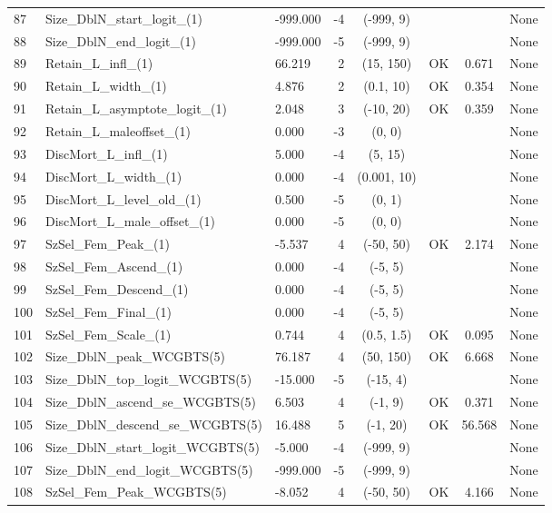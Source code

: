\documentclass[12pt,]{article}
\begin{document}
\begin{landscape}
\begin{longtable}{lp{2.5in}lrcccl}
  87 & Size\_DblN\_start\_logit\_(1) & -999.000 & -4 & (-999, 9) &  &  & None \\ 
  88 & Size\_DblN\_end\_logit\_(1) & -999.000 & -5 & (-999, 9) &  &  & None \\ 
  89 & Retain\_L\_infl\_(1) & 66.219 & 2 & (15, 150) & OK & 0.671 & None \\ 
  90 & Retain\_L\_width\_(1) & 4.876 & 2 & (0.1, 10) & OK & 0.354 & None \\ 
  91 & Retain\_L\_asymptote\_logit\_(1) & 2.048 & 3 & (-10, 20) & OK & 0.359 & None \\ 
  92 & Retain\_L\_maleoffset\_(1) & 0.000 & -3 & (0, 0) &  &  & None \\ 
  93 & DiscMort\_L\_infl\_(1) & 5.000 & -4 & (5, 15) &  &  & None \\ 
  94 & DiscMort\_L\_width\_(1) & 0.000 & -4 & (0.001, 10) &  &  & None \\ 
  95 & DiscMort\_L\_level\_old\_(1) & 0.500 & -5 & (0, 1) &  &  & None \\ 
  96 & DiscMort\_L\_male\_offset\_(1) & 0.000 & -5 & (0, 0) &  &  & None \\ 
  97 & SzSel\_Fem\_Peak\_(1) & -5.537 & 4 & (-50, 50) & OK & 2.174 & None \\ 
  98 & SzSel\_Fem\_Ascend\_(1) & 0.000 & -4 & (-5, 5) &  &  & None \\ 
  99 & SzSel\_Fem\_Descend\_(1) & 0.000 & -4 & (-5, 5) &  &  & None \\ 
  100 & SzSel\_Fem\_Final\_(1) & 0.000 & -4 & (-5, 5) &  &  & None \\ 
  101 & SzSel\_Fem\_Scale\_(1) & 0.744 & 4 & (0.5, 1.5) & OK & 0.095 & None \\ 
  102 & Size\_DblN\_peak\_WCGBTS(5) & 76.187 & 4 & (50, 150) & OK & 6.668 & None \\ 
  103 & Size\_DblN\_top\_logit\_WCGBTS(5) & -15.000 & -5 & (-15, 4) &  &  & None \\ 
  104 & Size\_DblN\_ascend\_se\_WCGBTS(5) & 6.503 & 4 & (-1, 9) & OK & 0.371 & None \\ 
  105 & Size\_DblN\_descend\_se\_WCGBTS(5) & 16.488 & 5 & (-1, 20) & OK & 56.568 & None \\ 
  106 & Size\_DblN\_start\_logit\_WCGBTS(5) & -5.000 & -4 & (-999, 9) &  &  & None \\ 
  107 & Size\_DblN\_end\_logit\_WCGBTS(5) & -999.000 & -5 & (-999, 9) &  &  & None \\ 
  108 & SzSel\_Fem\_Peak\_WCGBTS(5) & -8.052 & 4 & (-50, 50) & OK & 4.166 & None \\ 

\end{longtable}
\end{landscape}
\end{document}
